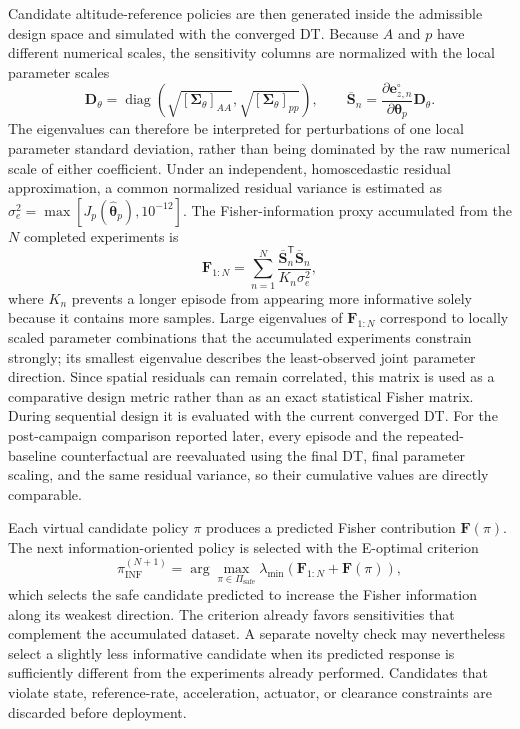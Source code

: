 \documentclass[journal]{IEEEtran}
\begin{document}
Candidate altitude-reference policies are then generated inside the admissible design space and simulated with the converged DT. Because $A$ and $p$ have different numerical scales, the sensitivity columns are normalized with the local parameter scales
\begin{equation}
 \mathbf D_{\theta}=\operatorname{diag}
 \left(\sqrt{[\boldsymbol{\Sigma}_{\theta}]_{AA}},
       \sqrt{[\boldsymbol{\Sigma}_{\theta}]_{pp}}\right),
 \qquad
 \overline{\mathbf S}_n=
 \frac{\partial\mathbf e_{z,n}^{\circ}}
 {\partial\boldsymbol{\theta}_p}\mathbf D_{\theta}.
\end{equation}
The eigenvalues can therefore be interpreted for perturbations of one local parameter standard deviation, rather than being dominated by the raw numerical scale of either coefficient. Under an independent, homoscedastic residual approximation, a common normalized residual variance is estimated as $\sigma_e^2=\max[J_p(\widehat{\boldsymbol{\theta}}_p),10^{-12}]$. The Fisher-information proxy accumulated from the $N$ completed experiments is
\begin{equation}
 \mathbf F_{1:N}=
 \sum_{n=1}^{N}
 \frac{\overline{\mathbf S}_n^{\mathsf T}\overline{\mathbf S}_n}
 {K_n\sigma_e^2},
 \label{eq:cumulative-fisher}
\end{equation}
where $K_n$ prevents a longer episode from appearing more informative solely because it contains more samples. Large eigenvalues of $\mathbf F_{1:N}$ correspond to locally scaled parameter combinations that the accumulated experiments constrain strongly; its smallest eigenvalue describes the least-observed joint parameter direction. Since spatial residuals can remain correlated, this matrix is used as a comparative design metric rather than as an exact statistical Fisher matrix. During sequential design it is evaluated with the current converged DT. For the post-campaign comparison reported later, every episode and the repeated-baseline counterfactual are reevaluated using the final DT, final parameter scaling, and the same residual variance, so their cumulative values are directly comparable.

Each virtual candidate policy $\pi$ produces a predicted Fisher contribution $\mathbf F(\pi)$. The next information-oriented policy is selected with the E-optimal criterion
\begin{equation}
 \pi_{\mathrm{INF}}^{(N+1)}=
 \arg\max_{\pi\in\Pi_{\mathrm{safe}}}
 \lambda_{\min}\!\left(
 \mathbf F_{1:N}+\mathbf F(\pi)
 \right),
 \label{eq:e-optimal-design}
\end{equation}
which selects the safe candidate predicted to increase the Fisher information along its weakest direction. The criterion already favors sensitivities that complement the accumulated dataset. A separate novelty check may nevertheless select a slightly less informative candidate when its predicted response is sufficiently different from the experiments already performed. Candidates that violate state, reference-rate, acceleration, actuator, or clearance constraints are discarded before deployment.
\end{document}
